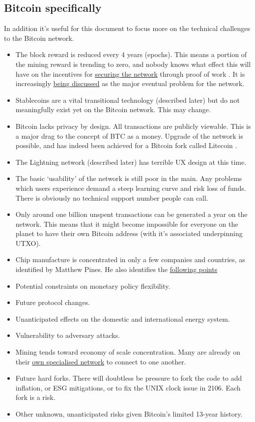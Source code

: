 \subsection{Bitcoin specifically}
\noindent In addition it's useful for this document to focus more on the technical challenges to the Bitcoin network.\par
\begin{itemize}
\item The block reward is reduced every 4 years (epochs). This means a portion of the mining reward is trending to zero, and nobody knows what effect this will have on the incentives for \href{https://www.truthcoin.info/blog/security-budget-ii-mm/}{securing the network} through proof of work \cite{carlsten2016instability}. It is increasingly \href{https://cryptostackers.substack.com/p/bitcoin-is-not-a-store-of-value?sd=pf&s=r}{being discussed} as the major eventual problem for the network.
\item Stablecoins are a vital transitional technology (described later) but do not meaningfully exist yet on the Bitcoin network. This may change.
\item Bitcoin lacks privacy by design. All transactions are publicly viewable. This is a major drag to the concept of BTC as a money. Upgrade of the network is possible, and has indeed been achieved for a Bitcoin fork called Litecoin \cite{fuchsbauer2019aggregate}. 
\item The Lightning network (described later) has terrible UX design at this time. 
\item The basic `usability' of the network is still poor in the main. Any problems which users experience demand a steep learning curve and risk loss of funds. There is obviously no technical support number people can call. 
\item Only around one billion unspent transactions can be generated a year on the network. This means that it might become impossible for everyone on the planet to have their own Bitcoin address (with it's associated underpinning UTXO).  
\item Chip manufacture is concentrated in only a few companies and countries, as identified by Matthew Pines. He also identifies the \href{https://www.btcpolicy.org/#Research}{following points}
\item Potential constraints on monetary policy flexibility.
\item Future protocol changes.
\item Unanticipated effects on the domestic and international energy system.
\item Vulnerability to adversary attacks.
\item Mining tends toward economy of scale concentration. Many are already on their \href{https://bitcoinfibre.org/}{own specialised network} to connect to one another.
\item Future hard forks. There will doubtless be pressure to fork the code to add inflation, or ESG mitigations, or to fix the UNIX clock issue in 2106. Each fork is a risk.
\item Other unknown, unanticipated risks given Bitcoin’s limited 13-year history.
\end{itemize} 


%
